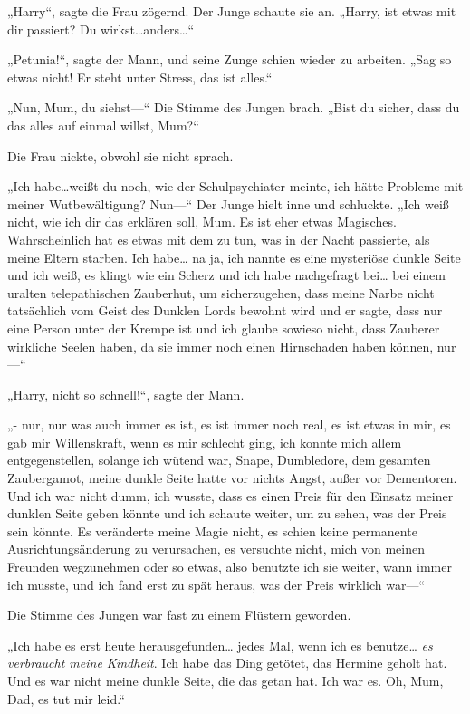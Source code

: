 {„Harry“, sagte die Frau zögernd. Der Junge schaute sie an. „Harry, ist etwas mit dir passiert? Du wirkst…anders…“

„Petunia!“, sagte der Mann, und seine Zunge schien wieder zu arbeiten. „Sag so etwas nicht! Er steht unter Stress, das ist alles.“

„Nun, Mum, du siehst—“ Die Stimme des Jungen brach. „Bist du sicher, dass du das alles auf einmal willst, Mum?“

Die Frau nickte, obwohl sie nicht sprach.

„Ich habe…weißt du noch, wie der Schulpsychiater meinte, ich hätte Probleme mit meiner Wutbewältigung? Nun—“ Der Junge hielt inne und schluckte. „Ich weiß nicht, wie ich dir das erklären soll, Mum. Es ist eher etwas Magisches. Wahrscheinlich hat es etwas mit dem zu tun, was in der Nacht passierte, als meine Eltern starben. Ich habe… na ja, ich nannte es eine mysteriöse dunkle Seite und ich weiß, es klingt wie ein Scherz und ich habe nachgefragt bei… bei einem uralten telepathischen Zauberhut, um sicherzugehen, dass meine Narbe nicht tatsächlich vom Geist des Dunklen Lords bewohnt wird und er sagte, dass nur eine Person unter der Krempe ist und ich glaube sowieso nicht, dass Zauberer wirkliche Seelen haben, da sie immer noch einen Hirnschaden haben können, nur—“

„Harry, nicht so schnell!“, sagte der Mann.

„- nur, nur was auch immer es ist, es ist immer noch real, es ist etwas in mir, es gab mir Willenskraft, wenn es mir schlecht ging, ich konnte mich allem entgegenstellen, solange ich wütend war, Snape, Dumbledore, dem gesamten Zaubergamot, meine dunkle Seite hatte vor nichts Angst, außer vor Dementoren. Und ich war nicht dumm, ich wusste, dass es einen Preis für den Einsatz meiner dunklen Seite geben könnte und ich schaute weiter, um zu sehen, was der Preis sein könnte. Es veränderte meine Magie nicht, es schien keine permanente Ausrichtungsänderung zu verursachen, es versuchte nicht, mich von meinen Freunden wegzunehmen oder so etwas, also benutzte ich sie weiter, wann immer ich musste, und ich fand erst zu spät heraus, was der Preis wirklich war—“

Die Stimme des Jungen war fast zu einem Flüstern geworden.

„Ich habe es erst heute herausgefunden… jedes Mal, wenn ich es benutze… \emph{es verbraucht meine Kindheit}. Ich habe das Ding getötet, das Hermine geholt hat. Und es war nicht meine dunkle Seite, die das getan hat. Ich war es. Oh, Mum, Dad, es tut mir leid.“

}
